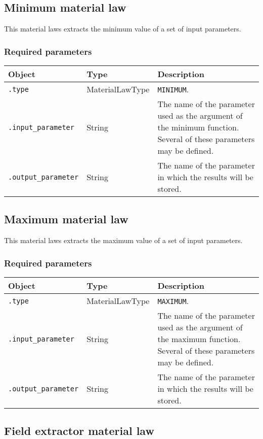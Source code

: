\documentclass[10pt]{article}
\begin{document}
\subsection{Minimum material law}

This material laws extracts the minimum value of a set of input parameters.

\subsubsection*{Required parameters}

\begin{tabularx}{\textwidth}{llX}
\hline 
Object & Type & Description \\ 
\hline 
\verb+.type+ & MaterialLawType & \verb+MINIMUM+. \\ 
\verb+.input_parameter+ & String & The name of the parameter used as the argument of the minimum function. Several of these parameters may be defined.\\
\verb+.output_parameter+ & String & The name of the parameter in which the results will be stored.\\
\hline 
\end{tabularx}

\subsection{Maximum material law}

This material laws extracts the maximum value of a set of input parameters.

\subsubsection*{Required parameters}

\begin{tabularx}{\textwidth}{llX}
\hline 
Object & Type & Description \\ 
\hline 
\verb+.type+ & MaterialLawType & \verb+MAXIMUM+. \\ 
\verb+.input_parameter+ & String & The name of the parameter used as the argument of the maximum function. Several of these parameters may be defined.\\
\verb+.output_parameter+ & String & The name of the parameter in which the results will be stored.\\
\hline 
\end{tabularx}

\subsection{Field extractor material law}
\end{document}
